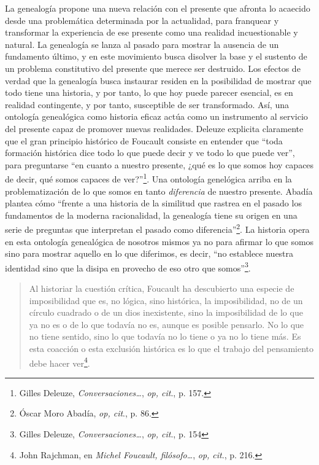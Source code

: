 La genealogía propone una nueva relación con el presente que afronta lo acaecido desde una problemática determinada por la actualidad, para franquear y transformar la experiencia de ese presente como una realidad incuestionable y natural. La genealogía se lanza al pasado para mostrar la ausencia de un fundamento último, y en este movimiento busca disolver la base y el sustento de un problema constitutivo del presente que merece ser destruido. Los efectos de verdad que la genealogía busca instaurar residen en la posibilidad de mostrar que todo tiene una historia, y por tanto, lo que hoy puede parecer esencial, es en realidad contingente, y por tanto, susceptible de ser transformado. Así, una ontología genealógica como historia eficaz actúa como un instrumento al servicio del presente capaz de promover nuevas realidades. Deleuze explicita claramente que el gran principio histórico de Foucault consiste en entender que \enquote{toda formación histórica dice todo lo que puede decir y ve todo lo que puede ver}, para preguntarse \enquote{en cuanto a nuestro presente, ¿qué es lo que somos hoy capaces de decir, qué somos capaces de ver?}\footnote{Gilles Deleuze, \emph{Conversaciones\ldots{}}, \emph{op, cit}., p. 157.}. Una ontología genelógica arriba en la problematización de lo que somos en tanto \emph{diferencia} de nuestro presente. Abadía plantea cómo \enquote{frente a una historia de la similitud que rastrea en el pasado los fundamentos de la moderna racionalidad, la genealogía tiene su origen en una serie de preguntas que interpretan el pasado como diferencia}\footnote{Óscar Moro Abadía, \emph{op, cit}., p. 86.}. La historia opera en esta ontología genealógica de nosotros mismos ya no para afirmar lo que somos sino para mostrar aquello en lo que diferimos, es decir, \enquote{no establece nuestra identidad sino que la disipa en provecho de eso otro que somos}\footnote{Gilles Deleuze, \emph{Conversaciones\ldots{}}, \emph{op, cit}., p. 154}.

\begin{quote}
Al historiar la cuestión crítica, Foucault ha descubierto una especie de imposibilidad que es, no lógica, sino histórica, la imposibilidad, no de un círculo cuadrado o de un dios inexistente, sino la imposibilidad de lo que ya no es o de lo que todavía no es, aunque es posible pensarlo. No lo que no tiene sentido, sino lo que todavía no lo tiene o ya no lo tiene más. Es esta coacción o esta exclusión histórica es lo que el trabajo del pensamiento debe hacer ver\footnote{John Rajchman, en \emph{Michel Foucault, filósofo\ldots{}}, \emph{op, cit}., p. 216.}.
\end{quote}

